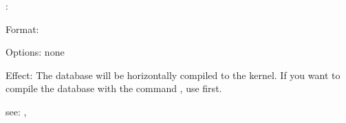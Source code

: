 \horizon:

Format: 

Options: none

Effect: The \RELFUN{} database will be horizontally compiled to the \RELFUN{}
	kernel.
	If you want to compile the database with the command , use 
	 first.

see: \compile, \verti
